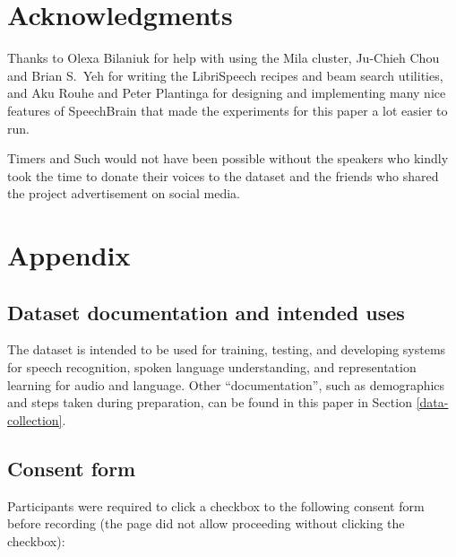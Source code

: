 \documentclass{article}
\begin{document}
\section*{Acknowledgments}
Thanks to Olexa Bilaniuk for help with using the Mila cluster, Ju-Chieh Chou and Brian S.~Yeh for writing the LibriSpeech recipes and beam search utilities, and Aku Rouhe and Peter Plantinga for designing and implementing many nice features of SpeechBrain that made the experiments for this paper a lot easier to run. 

Timers and Such would not have been possible without the speakers who kindly took the time to donate their voices to the dataset and the friends who shared the project advertisement on social media.


























\appendix

\clearpage
\section{Appendix}













\subsection{Dataset documentation and intended uses}

The dataset is intended to be used for training, testing, and developing systems for speech recognition, spoken language understanding, and representation learning for audio and language. Other ``documentation'', such as demographics and steps taken during preparation, can be found in this paper in Section \ref{data-collection}.

\subsection{Consent form}\label{consent-form}
Participants were required to click a checkbox to the following consent form before recording (the page did not allow proceeding without clicking the checkbox):
    
\end{document}
